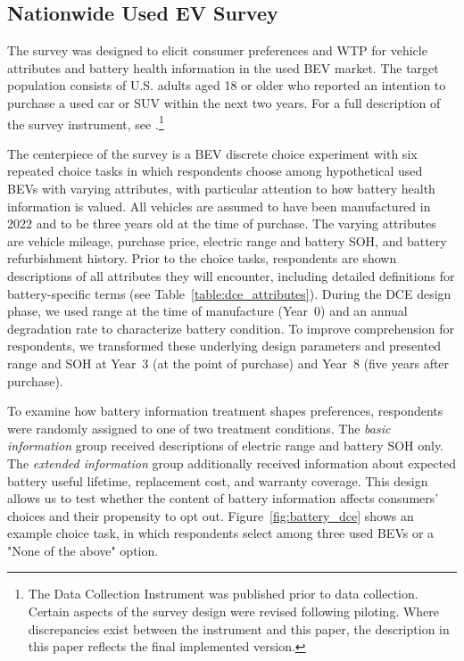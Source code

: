 \documentclass[a4paper,fleqn]{cas-sc}   %
\begin{document}
\subsection{Nationwide Used EV Survey}

The survey was designed to elicit consumer preferences and WTP for vehicle attributes and battery health information in the used BEV market. The target population consists of U.S. adults aged 18 or older who reported an intention to purchase a used car or SUV within the next two years. For a full description of the survey instrument, see \textcite{goreDCIConsumerValuation2025}.\footnote{The Data Collection Instrument was published prior to data collection. Certain aspects of the survey design were revised following piloting. Where discrepancies exist between the instrument and this paper, the description in this paper reflects the final implemented version.}

The centerpiece of the survey is a BEV discrete choice experiment with six repeated choice tasks in which respondents choose among hypothetical used BEVs with varying attributes, with particular attention to how battery health information is valued. All vehicles are assumed to have been manufactured in 2022 and to be three years old at the time of purchase. The varying attributes are vehicle mileage, purchase price, electric range and battery SOH, and battery refurbishment history. Prior to the choice tasks, respondents are shown descriptions of all attributes they will encounter, including detailed definitions for battery-specific terms (see Table~\ref{table:dce_attributes}). During the DCE design phase, we used range at the time of manufacture (Year~0) and an annual degradation rate to characterize battery condition. To improve comprehension for respondents, we transformed these underlying design parameters and presented range and SOH at Year~3 (at the point of purchase) and Year~8 (five years after purchase).

To examine how battery information treatment shapes preferences, respondents were randomly assigned to one of two treatment conditions. The \textit{basic information} group received descriptions of electric range and battery SOH only. The \textit{extended information} group additionally received information about expected battery useful lifetime, replacement cost, and warranty coverage. This design allows us to test whether the content of battery information affects consumers' choices and their propensity to opt out. Figure~\ref{fig:battery_dce} shows an example choice task, in which respondents select among three used BEVs or a "None of the above" option.
\end{document}
